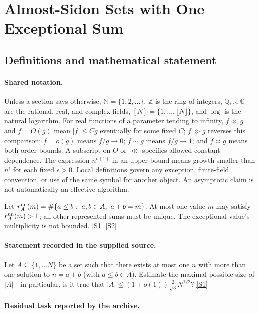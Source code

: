 \documentclass[11pt,a4paper]{article}
\newcommand{\N}{\mathbb{N}}
\newcommand{\Z}{\mathbb{Z}}
\newcommand{\Q}{\mathbb{Q}}
\newcommand{\R}{\mathbb{R}}
\newcommand{\C}{\mathbb{C}}
\newcommand{\sref}[2]{\hyperlink{source:#1:#2}{[S#2]}}
\begin{document}
\section{Almost-Sidon Sets with One Exceptional Sum}\label{statement}


\subsection{Definitions and mathematical statement}

\paragraph{Shared notation.}Unless a section says otherwise, $\N=\{1,2,\ldots\}$,
$\Z$ is the ring of integers, $\Q,\R,\C$ are the rational, real, and complex
fields, $[N]=\{1,\ldots,\lfloor N\rfloor\}$, and $\log$ is the natural
logarithm. For real functions of a parameter tending to infinity,
$f\ll g$ and $f=O(g)$ mean $|f|\leq Cg$ eventually for some fixed $C$;
$f\gg g$ reverses this comparison; $f=o(g)$ means $f/g\to0$;
$f\sim g$ means $f/g\to1$; and $f\asymp g$ means both order bounds.
A subscript on $O$ or $\ll$ specifies allowed constant dependence.
The expression $n^{o(1)}$ in an upper bound means growth smaller than
$n^\epsilon$ for each fixed $\epsilon>0$. Local definitions govern any
exception, finite-field convention, or use of the same symbol for another
object. An asymptotic claim is not automatically an effective algorithm.



Let $r_A^{\rm un}(m)=\#\{a\leq b:\ a,b\in A,\ a+b=m\}$. At most one value $m$ may satisfy $r_A^{\rm un}(m)>1$; all other represented sums must be unique. The exceptional value's multiplicity is not bounded. \sref{statement}{1} \sref{statement}{2}

\paragraph{Statement recorded in the supplied source.}
Let $A\subseteq \{1,\ldots N\}$ be a set such that there exists at most one $n$ with more than one solution to $n=a+b$ (with $a\leq b\in A$). Estimate the maximal possible size of $\lvert A\rvert$ - in particular, is it true that $ \lvert A\rvert \leq (1+o(1))\frac{2}{\sqrt{3}}N^{1/2}? $ \sref{statement}{1}

\paragraph{Residual task reported by the archive.}
\end{document}
